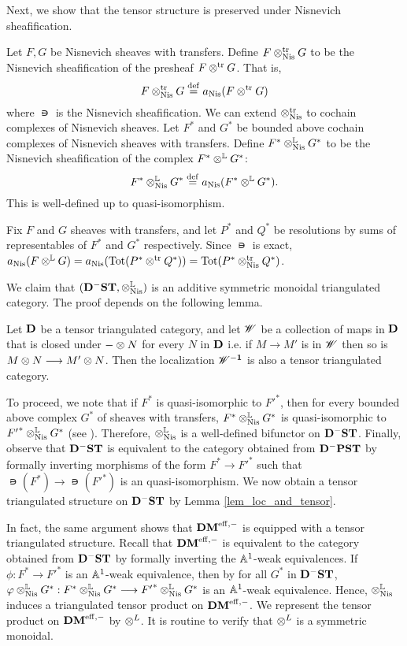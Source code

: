 Next, we show that the tensor structure is preserved under
Nisnevich sheafification.

\begin{defn}\label{def_shcor_tensor}
Let $F, G$ be Nisnevich sheaves with transfers. Define
$F \ttrNis G$ to be the Nisnevich sheafification of the presheaf
$F \ttr G$. That is,
\[
F \ttrNis G \defeq \nis(F \ttr G)
\]
where $\nis$ is the Nisnevich sheafification. We can extend 
$\ttrNis$ to cochain complexes of Nisnevich sheaves. Let $F^*$ and 
$G^*$ be bounded above cochain complexes of Nisnevich sheaves with transfers. 
Define $F^* \tLNis G^*$ to be the Nisnevich sheafification of the 
complex $F^* \tL G^*$:
\[
F^* \tLNis G^* \defeq \nis(F^* \tL G^*).
\]
This is well-defined up to quasi-isomorphism.
\end{defn}

\begin{rmk}
Fix $F$ and $G$ sheaves with transfers, and let $P^*$ and $Q^*$ be
resolutions by sums of representables of $F^*$ and $G^*$
respectively. Since $\nis$ is exact, $\nis(F \tL G) =
\nis(\Tot(P^* \ttr Q^*)) = \Tot(P^* \ttrNis Q^*)$.
\end{rmk}

We claim that $(\DShCor, \tLNis)$ is an additive symmetric 
monoidal triangulated category. The proof depends on the following
lemma.

\begin{lem}\label{lem_loc_and_tensor}
Let $\DCat$ be a tensor triangulated category, and let $\Cat{W}$
be a collection of maps in $\DCat$ that is closed under $-\tensor 
N$ for every $N$ in $\DCat$ i.e. if $M \to M'$ is in $\Cat{W}$ then 
so is $M \tensor N \to M' \tensor N$. Then the localization $\DCat 
[\Cat{W}^{-1}]$ is also a tensor triangulated category.
\end{lem}

To proceed, we note that if $F^*$ is quasi-isomorphic to ${F'}^*$,
then for every bounded above complex $G^*$ of sheaves with 
transfers, $F^* \tLNis G^*$ is quasi-isomorphic to 
${F'}^* \tLNis G^*$ (see \cite[8.16]{MVW}). Therefore, $\tLNis$ is 
a well-defined bifunctor on $\DShCor$. Finally, observe that 
$\DShCor$ is equivalent to the category obtained from $\DCat^-\PST$ by formally inverting 
morphisms of the form $F^* \to {F'}^*$ such that $\nis(F^*) \to 
\nis({F'}^*)$ is an quasi-isomorphism. We now obtain a tensor triangulated 
structure on $\DShCor$ by Lemma \ref{lem_loc_and_tensor}.

In fact, the same argument shows that $\DMeff$ is equipped with a
tensor triangulated structure. Recall that $\DMeff$ is equivalent to
the category obtained from $\DShCor$ by formally inverting the
$\A^1$-weak equivalences. If $\phi : F^* \to
{F'}^*$ is an $\A^1$-weak equivalence, then by \cite[9.5]{MVW} for all $G^*$ in
$\DShCor$, $\phi \tLNis G^* : F^* \tLNis G^* \to {F'}^* \tLNis G^*$ is
an $\A^1$-weak equivalence. Hence, $\tLNis$ induces a triangulated tensor 
product on $\DMeff$. We represent the tensor product on $\DMeff$ by $\tDM$.
It is routine to verify that $\tDM$ is a symmetric monoidal. 

